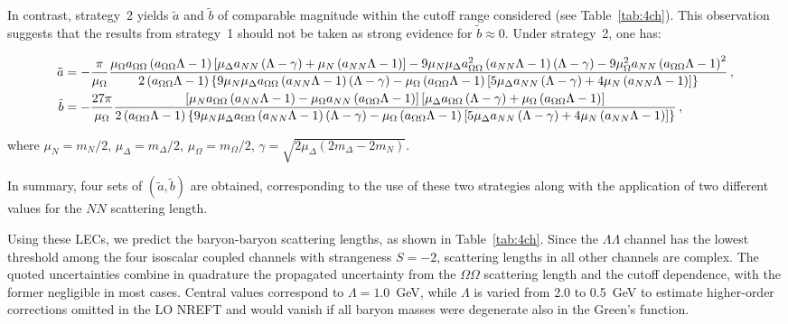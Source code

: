 \documentclass[prl,showpacs,twocolumn,superscriptaddress,floatfix,10pt,footinbib]{revtex4-2}
\begin{document}
In contrast, strategy~2 yields $\tilde{a}$ and $\tilde{b}$ of comparable magnitude within the cutoff range considered (see Table~\ref{tab:4ch}). This observation suggests that the results from strategy~1 should not be taken as strong evidence for $\tilde{b} \approx 0$. Under strategy~2, one has:
\begin{widetext}
\begin{align}
\tilde{a}&=-\frac{\pi}{\mu_{\Omega}}\frac{\mu _{\Omega}a_{\Omega \Omega}\left( a_{\Omega \Omega}\Lambda -1 \right) \left[ \mu _{\Delta}a_{NN}\left( \Lambda -\gamma \right) +\mu _N\left( a_{NN}\Lambda -1 \right) \right] -9\mu _N\mu _{\Delta}a_{\Omega \Omega}^{2}\left( a_{NN}\Lambda -1 \right) \left( \Lambda -\gamma \right) -9\mu _{\Omega}^{2}a_{NN}\left( a_{\Omega \Omega}\Lambda -1 \right) ^2}{2\left( a_{\Omega \Omega}\Lambda -1 \right) \left\{ 9\mu _N\mu _{\Delta}a_{\Omega \Omega}\left( a_{NN}\Lambda -1 \right) \left( \Lambda -\gamma \right) -\mu _{\Omega}\left( a_{\Omega \Omega}\Lambda -1 \right) \left[ 5\mu _{\Delta}a_{NN}\left( \Lambda -\gamma \right) +4\mu _N\left( a_{NN}\Lambda -1 \right) \right] \right\}}\,, \notag\\
\label{eq:bsol}
\tilde{b}&=-\frac{27\pi}{\mu_{\Omega}}\frac{\left[ \mu _Na_{\Omega \Omega}\left( a_{NN}\Lambda -1 \right) -\mu _{\Omega}a_{NN}\left( a_{\Omega \Omega}\Lambda -1 \right) \right] \left[ \mu _{\Delta}a_{\Omega \Omega}\left( \Lambda -\gamma \right) +\mu _{\Omega}\left( a_{\Omega \Omega}\Lambda -1 \right) \right]}{2\left( a_{\Omega \Omega}\Lambda -1 \right) \left\{ 9\mu _N\mu _{\Delta}a_{\Omega \Omega}\left( a_{NN}\Lambda -1 \right) \left( \Lambda -\gamma \right) -\mu _{\Omega}\left( a_{\Omega \Omega}\Lambda -1 \right) \left[ 5\mu _{\Delta}a_{NN}\left( \Lambda -\gamma \right) +4\mu _N\left( a_{NN}\Lambda -1 \right) \right] \right\}}\,,
\end{align}
\end{widetext}
where $\mu_N=m_N/2$, $\mu_\Delta=m_\Delta/2$, $\mu_\Omega=m_\Omega/2$, $\gamma=\sqrt{2\mu_\Delta(2m_\Delta-2m_N)}$.

In summary, four sets of $(\tilde{a},\tilde{b})$ are obtained, corresponding to the use of these two strategies along with the application of two different values for the $NN$ scattering length.

Using these LECs, we predict the baryon-baryon scattering lengths, as shown in Table~\ref{tab:4ch}. Since the $\Lambda\Lambda$ channel has the lowest threshold among the four isoscalar coupled channels with strangeness $S=-2$, scattering lengths in all other channels are complex. The quoted uncertainties combine in quadrature the propagated uncertainty from the $\Omega\Omega$ scattering length and the cutoff dependence, with the former negligible in most cases. Central values correspond to $\Lambda = 1.0$~GeV, while $\Lambda$ is varied from 2.0 to 0.5~GeV to estimate higher-order corrections omitted in the LO NREFT and would vanish if all baryon masses were degenerate also in the Green's function.
\end{document}
